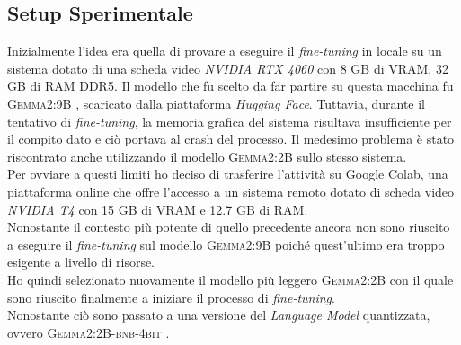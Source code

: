 \subsection{Setup Sperimentale}
Inizialmente l'idea era quella di provare a eseguire il \emph{fine-tuning} in locale su un sistema dotato di una scheda video \emph{NVIDIA RTX 4060} con 8 GB di VRAM, 32 GB di RAM DDR5. Il modello che fu scelto da far partire su questa macchina fu \textsc{Gemma2:9B} \cite{gemma_2024}, scaricato dalla piattaforma \emph{Hugging Face}. Tuttavia, durante il tentativo di \emph{fine-tuning}, la memoria grafica del sistema risultava insufficiente per il compito dato e ci\`o portava al crash del processo. Il medesimo problema \`e stato riscontrato anche utilizzando il modello \textsc{Gemma2:2B} sullo stesso sistema.\\
Per ovviare a questi limiti ho deciso di trasferire l'attivit\`a su Google Colab, una piattaforma online che offre l'accesso a un sistema remoto dotato di scheda video \emph{NVIDIA T4} con 15 GB di VRAM e 12.7 GB di RAM.\\
Nonostante il contesto pi\`u potente di quello precedente ancora non sono riuscito a eseguire il \emph{fine-tuning} sul modello \textsc{Gemma2:9B} poich\'e quest'ultimo era troppo esigente a livello di risorse.\\
Ho quindi selezionato nuovamente il modello pi\`u leggero \textsc{Gemma2:2B} con il quale sono riuscito finalmente a iniziare il processo di \emph{fine-tuning}.\\
Nonostante ci\`o sono passato a una versione del \emph{Language Model} quantizzata, ovvero \textsc{Gemma2:2B-bnb-4bit} \cite{unsloth2024gemma2-2b-bnb-4bit}.


